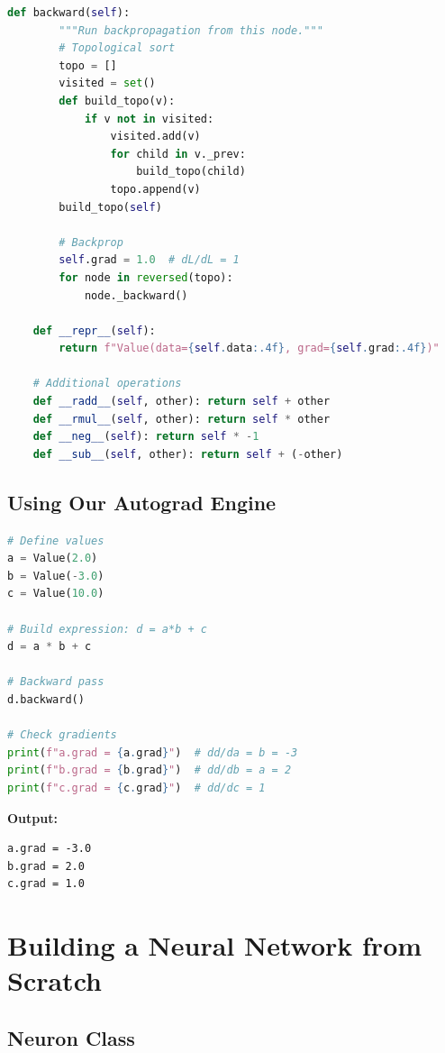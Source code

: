 \begin{lstlisting}[language=Python, caption={Simple Autograd Engine: Value Class}]
    def backward(self):
        """Run backpropagation from this node."""
        # Topological sort
        topo = []
        visited = set()
        def build_topo(v):
            if v not in visited:
                visited.add(v)
                for child in v._prev:
                    build_topo(child)
                topo.append(v)
        build_topo(self)
        
        # Backprop
        self.grad = 1.0  # dL/dL = 1
        for node in reversed(topo):
            node._backward()
    
    def __repr__(self):
        return f"Value(data={self.data:.4f}, grad={self.grad:.4f})"
    
    # Additional operations
    def __radd__(self, other): return self + other
    def __rmul__(self, other): return self * other
    def __neg__(self): return self * -1
    def __sub__(self, other): return self + (-other)
\end{lstlisting}

\subsection{Using Our Autograd Engine}

\begin{lstlisting}[language=Python, caption={Example: Computing Gradients}]
# Define values
a = Value(2.0)
b = Value(-3.0)
c = Value(10.0)

# Build expression: d = a*b + c
d = a * b + c

# Backward pass
d.backward()

# Check gradients
print(f"a.grad = {a.grad}")  # dd/da = b = -3
print(f"b.grad = {b.grad}")  # dd/db = a = 2
print(f"c.grad = {c.grad}")  # dd/dc = 1
\end{lstlisting}

\textbf{Output:}
\begin{verbatim}
a.grad = -3.0
b.grad = 2.0
c.grad = 1.0
\end{verbatim}

\section{Building a Neural Network from Scratch}

\subsection{Neuron Class}


